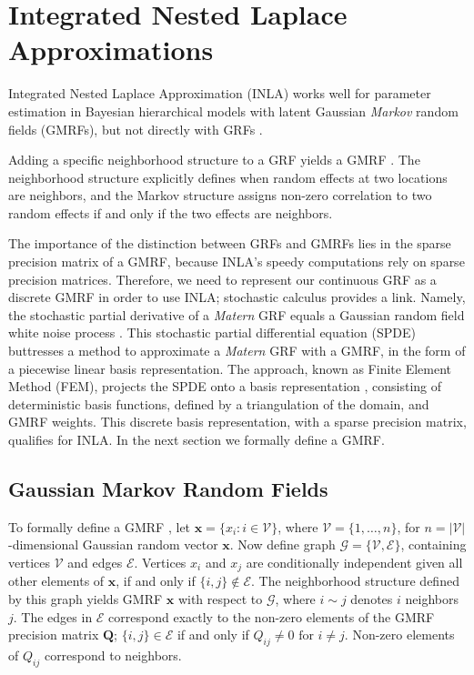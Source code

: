 \section{Integrated Nested Laplace Approximations} \label{INLA} %
Integrated Nested Laplace Approximation (INLA) works well for parameter estimation in Bayesian hierarchical models with latent Gaussian {\it Markov} random fields (GMRFs), but not directly with GRFs \citep{Rue2007}.

Adding a specific neighborhood structure to a GRF yields a GMRF \citep{Rue2007}. The neighborhood structure explicitly defines when random effects at two locations are neighbors, and the Markov structure assigns non-zero correlation to two random effects if and only if the two effects are neighbors. 

The importance of the distinction between GRFs and GMRFs lies in the sparse precision matrix of a GMRF, because INLA's speedy computations rely on sparse precision matrices. Therefore, we need to represent our continuous GRF as a discrete GMRF in order to use INLA; stochastic calculus provides a link. Namely, the stochastic partial derivative of a {\it Matern} GRF equals a Gaussian random field white noise process \citep{Lindgren2011}. This stochastic partial differential equation (SPDE) buttresses a method to approximate a {\it Matern} GRF with a GMRF, in the form of a piecewise linear basis representation. The approach, known as Finite Element Method (FEM), projects the SPDE onto a basis representation \citep{Dhatt2012}, consisting of deterministic basis functions, defined by a triangulation of the domain, and GMRF weights. This discrete basis representation, with a sparse precision matrix, qualifies for INLA. In the next section we formally define a GMRF.


\subsection{Gaussian Markov Random Fields}

To formally define a GMRF \citep{Rue2007}, let $\pmb{x} = \{ x_{i}:i \in \mathscr{V} \}$, where $\mathscr{V} = \{1,\dots,n\}$, for $n = |\mathscr{V}|$-dimensional Gaussian random vector $\pmb{x}$. Now define graph $\mathscr{G} = \{ \mathscr{V}, \mathscr{E} \}$, containing vertices $\mathscr{V}$ and edges $\mathscr{E}$. Vertices $x_{i}$ and $x_{j}$ are conditionally independent given all other elements of $\pmb{x}$, if and only if $\{i, j\} \notin \mathscr{E}$. The neighborhood structure defined by this graph yields GMRF $\pmb{x}$ with respect to $\mathscr{G}$, where $i \sim j$ denotes $i$ neighbors $j$. The edges in $\mathscr{E}$ correspond exactly to the non-zero elements of the GMRF precision matrix $\pmb{Q}$; $\{ i, j \} \in \mathscr{E}$ if and only if $Q_{ij} \neq 0 \text{ for } i \neq j$. Non-zero elements of $Q_{ij}$ correspond to neighbors.

